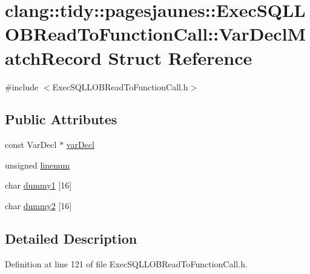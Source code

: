 \hypertarget{structclang_1_1tidy_1_1pagesjaunes_1_1_exec_s_q_l_l_o_b_read_to_function_call_1_1_var_decl_match_record}{}\section{clang\+:\+:tidy\+:\+:pagesjaunes\+:\+:Exec\+S\+Q\+L\+L\+O\+B\+Read\+To\+Function\+Call\+:\+:Var\+Decl\+Match\+Record Struct Reference}
\label{structclang_1_1tidy_1_1pagesjaunes_1_1_exec_s_q_l_l_o_b_read_to_function_call_1_1_var_decl_match_record}


{\ttfamily \#include $<$Exec\+S\+Q\+L\+L\+O\+B\+Read\+To\+Function\+Call.\+h$>$}

\subsection*{Public Attributes}
\begin{DoxyCompactItemize}
\item 
const Var\+Decl $\ast$ \hyperlink{structclang_1_1tidy_1_1pagesjaunes_1_1_exec_s_q_l_l_o_b_read_to_function_call_1_1_var_decl_match_record_a3e18a0834d105adb1c79af722a0d99a6}{var\+Decl}
\item 
unsigned \hyperlink{structclang_1_1tidy_1_1pagesjaunes_1_1_exec_s_q_l_l_o_b_read_to_function_call_1_1_var_decl_match_record_a4ba4c670876e32a37acd3bfd0ec2f028}{linenum}
\item 
char \hyperlink{structclang_1_1tidy_1_1pagesjaunes_1_1_exec_s_q_l_l_o_b_read_to_function_call_1_1_var_decl_match_record_ae9df98ba254a948bd1da03fb69f38777}{dummy1} \mbox{[}16\mbox{]}
\item 
char \hyperlink{structclang_1_1tidy_1_1pagesjaunes_1_1_exec_s_q_l_l_o_b_read_to_function_call_1_1_var_decl_match_record_a014aedc3a229ef0ab736cf713ecd1eeb}{dummy2} \mbox{[}16\mbox{]}
\end{DoxyCompactItemize}


\subsection{Detailed Description}


Definition at line 121 of file Exec\+S\+Q\+L\+L\+O\+B\+Read\+To\+Function\+Call.\+h.



